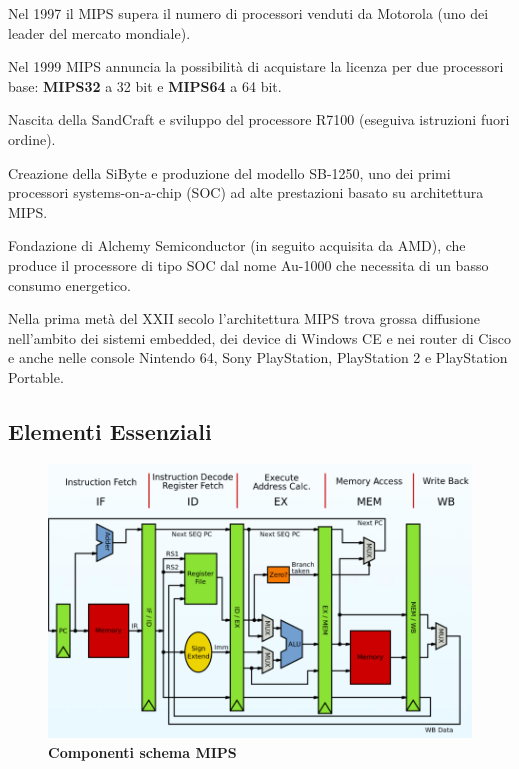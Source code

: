 \documentclass[12pt]{article}
\begin{document}
Nel 1997 il MIPS supera il numero di processori venduti da Motorola (uno dei leader del mercato mondiale).\par\medskip\noindent
Nel 1999 MIPS annuncia la possibilità di acquistare la licenza per due processori base: \textbf{MIPS32} a 32 bit e \textbf{MIPS64} a 64 bit.\par\medskip\noindent
Nascita della SandCraft e sviluppo del processore R7100 (eseguiva istruzioni fuori ordine).\par\medskip\noindent 
Creazione della SiByte e produzione del modello SB-1250, uno dei primi processori systems-on-a-chip (SOC) ad alte prestazioni basato su architettura MIPS.\par\medskip\noindent
Fondazione di Alchemy Semiconductor (in seguito acquisita da AMD), che produce il processore di tipo SOC dal nome Au-1000 che necessita di un basso consumo energetico.\par\medskip\noindent
Nella prima metà del XXII secolo l’architettura MIPS trova grossa diffusione nell’ambito dei sistemi embedded, dei device di Windows CE e nei router di Cisco e anche nelle console Nintendo 64, Sony PlayStation, PlayStation 2 e PlayStation Portable.\par\medskip\noindent 
\subsection{Elementi Essenziali}
\begin{figure}[h]
\centering
\includegraphics[width=0.75\linewidth]{schema mips.png}
\caption{\textbf{Componenti schema MIPS}}
\label{fig:enter-label}
\end{figure}
\vspace{\baselineskip}
\end{document}
